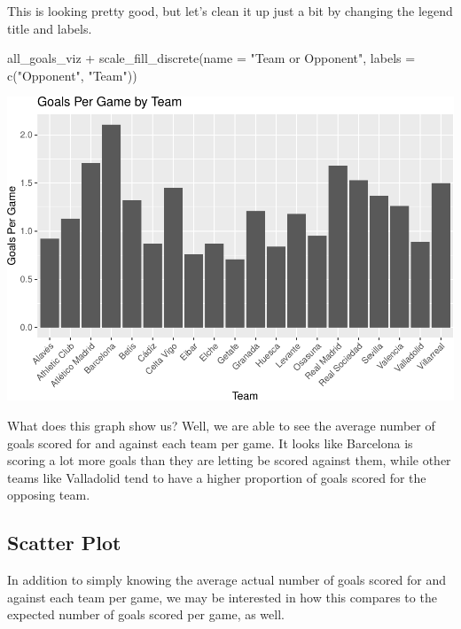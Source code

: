 \documentclass[
  11pt,
]{book}
\newenvironment{Shaded}{\begin{snugshade}}{\end{snugshade}}
\newcommand{\AttributeTok}[1]{\textcolor[rgb]{0.77,0.63,0.00}{#1}}
\newcommand{\FunctionTok}[1]{\textcolor[rgb]{0.00,0.00,0.00}{#1}}
\newcommand{\NormalTok}[1]{#1}
\newcommand{\SpecialCharTok}[1]{\textcolor[rgb]{0.00,0.00,0.00}{#1}}
\newcommand{\StringTok}[1]{\textcolor[rgb]{0.31,0.60,0.02}{#1}}
\theoremstyle{definition}
\theoremstyle{definition}
\theoremstyle{definition}
\theoremstyle{definition}
\theoremstyle{remark}
\begin{document}
This is looking pretty good, but let's clean it up just a bit by changing the legend title and labels.

\begin{Shaded}
\begin{Highlighting}[]
\NormalTok{all\_goals\_viz }\SpecialCharTok{+} \FunctionTok{scale\_fill\_discrete}\NormalTok{(}\AttributeTok{name =} \StringTok{"Team or Opponent"}\NormalTok{, }\AttributeTok{labels =} \FunctionTok{c}\NormalTok{(}\StringTok{"Opponent"}\NormalTok{,}
    \StringTok{"Team"}\NormalTok{))}
\end{Highlighting}
\end{Shaded}

\includegraphics{series_files/figure-latex/unnamed-chunk-41-1.pdf}

What does this graph show us? Well, we are able to see the average number of goals scored for and against each team per game. It looks like Barcelona is scoring a lot more goals than they are letting be scored against them, while other teams like Valladolid tend to have a higher proportion of goals scored for the opposing team.

\hypertarget{scatter-plot-1}{%
\subsection{Scatter Plot}\label{scatter-plot-1}}

In addition to simply knowing the average actual number of goals scored for and against each team per game, we may be interested in how this compares to the expected number of goals scored per game, as well.
\end{document}
